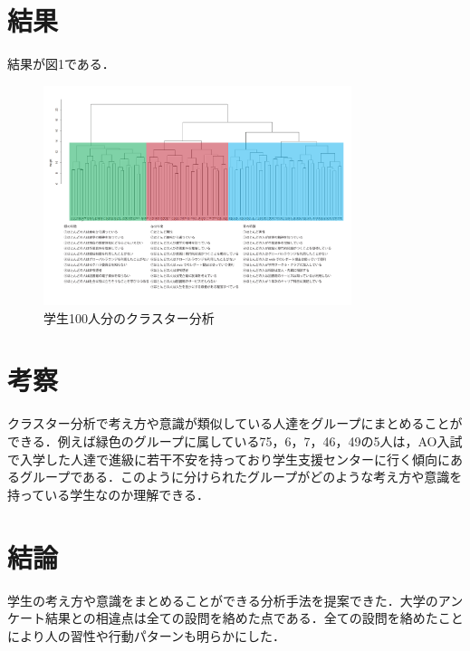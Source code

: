 \documentclass[uplatex,twocolumn,dvipdfmx]{jsarticle}
\begin{document}
\section{結果}
結果が図1である．
\begin{figure}[h]
\centering
\includegraphics[width=9cm]{clusterresults.pdf}
\caption{学生100人分のクラスター分析}\label{学生100人分のクラスター分析}
\end{figure}
\section{考察}
クラスター分析で考え方や意識が類似している人達をグループにまとめることができる．例えば緑色のグループに属している75，6，7，46，49の5人は，AO入試で入学した人達で進級に若干不安を持っており学生支援センターに行く傾向にあるグループである．このように分けられたグループがどのような考え方や意識を持っている学生なのか理解できる．
\section{結論}
学生の考え方や意識をまとめることができる分析手法を提案できた．大学のアンケート結果との相違点は全ての設問を絡めた点である．全ての設問を絡めたことにより人の習性や行動パターンも明らかにした．

\end{document}
